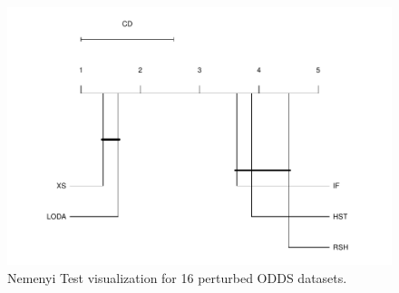 \documentclass[11pt,onecolumn]{article}
\begin{document}
\begin{figure}[ht!]
    \centering
        \includegraphics[width=0.7\linewidth]{fig/Nemenyi_Distort_16.pdf}
        \caption{Nemenyi Test visualization for 16 perturbed ODDS datasets.}
    \label{fig:Nemenyi-ODDS-distort}
\end{figure}



\printbibliography
\end{document}
